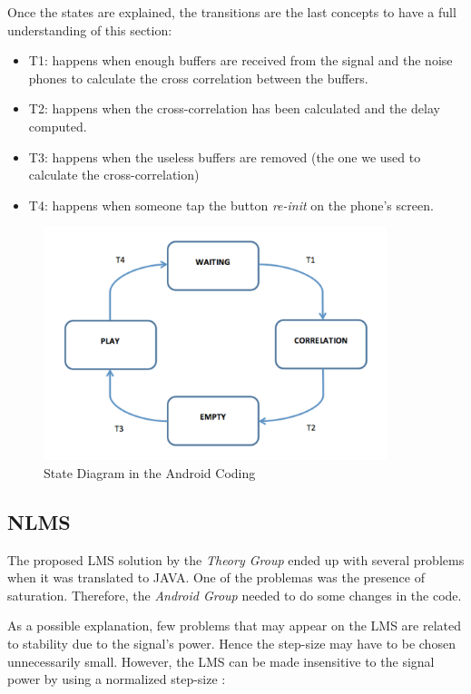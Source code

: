 \documentclass[11pt,a4paper,english]{book}  %
\theoremstyle{definition}  %
\theoremstyle{plain}  %
\theoremstyle{remark}  %
\begin{document}
		Once the states are explained, the transitions are the last concepts to have a full understanding of this section:
		
		\begin{itemize}
		\item T1: happens when enough buffers are received from the signal and the noise phones to calculate the cross correlation between the buffers.
		\item T2: happens when the cross-correlation has been calculated and the delay computed.
		\item T3: happens when the useless buffers are removed (the one we used to calculate the cross-correlation)
		\item T4: happens when someone tap the button \textit{re-init} on the phone’s screen.
		\end{itemize}


		\begin{figure}[h]
		\centering
		\includegraphics[width=10cm]{images/android/states}
		\caption{State Diagram in the Android Coding}
		\label{fig:states}
		\end{figure}	
		
		
		\subsection{NLMS}
		
		The proposed LMS solution by the \textit{Theory Group} ended up with several problems when it was translated to JAVA. One of the problemas was the presence of saturation. Therefore, the \textit{Android Group} needed to do some changes in the code.
		
		As a possible explanation, few problems that may appear on the LMS are related to stability due to the signal's power. Hence the step-size may have to be chosen unnecessarily small. However, the LMS can be made insensitive to the signal power by using a normalized step-size \cite{asp}:
		
\end{document}
